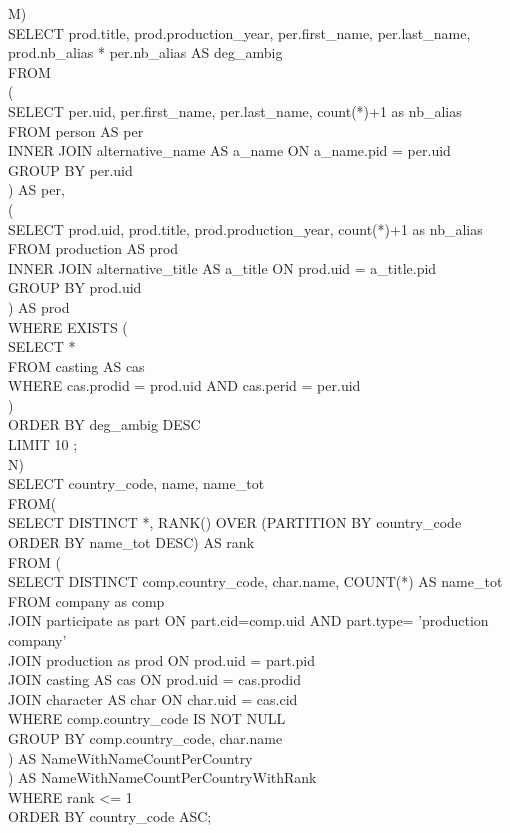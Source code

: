 \documentclass{article}
\begin{document}
M)\\
SELECT prod.title, prod.production_year, per.first_name, per.last_name, prod.nb_alias * per.nb_alias AS deg_ambig\\
FROM\\
(\\
	SELECT per.uid, per.first_name, per.last_name, count(*)+1 as nb_alias\\
	FROM person AS per\\
	INNER JOIN alternative_name AS a_name ON a_name.pid = per.uid\\
	GROUP BY per.uid\\
) AS per,\\
(\\
	SELECT prod.uid, prod.title, prod.production_year, count(*)+1 as nb_alias\\
	FROM production AS prod\\
	INNER JOIN alternative_title AS a_title ON prod.uid = a_title.pid\\
	GROUP BY prod.uid\\
) AS prod\\
WHERE EXISTS (\\ 
	SELECT *\\
	FROM casting AS cas\\
	WHERE cas.prodid = prod.uid AND cas.perid = per.uid\\
)\\
ORDER BY deg_ambig DESC\\
LIMIT 10 ;\\

N)\\
SELECT  country_code, name, name_tot\\
FROM(\\
    SELECT DISTINCT *, RANK() OVER (PARTITION BY country_code ORDER BY name_tot DESC) AS rank\\
    FROM (\\
        SELECT DISTINCT comp.country_code, char.name, COUNT(*) AS name_tot\\
       FROM company as comp\\
	JOIN participate as part ON part.cid=comp.uid AND part.type= 'production company'\\
	JOIN production as prod ON prod.uid = part.pid\\
	JOIN casting AS cas ON prod.uid = cas.prodid\\
	JOIN character AS char ON char.uid = cas.cid\\
        WHERE comp.country_code IS NOT NULL\\
        GROUP BY comp.country_code, char.name\\
    ) AS NameWithNameCountPerCountry\\
) AS NameWithNameCountPerCountryWithRank\\
WHERE rank <= 1\\
ORDER BY country_code ASC;\\
\end{document}

